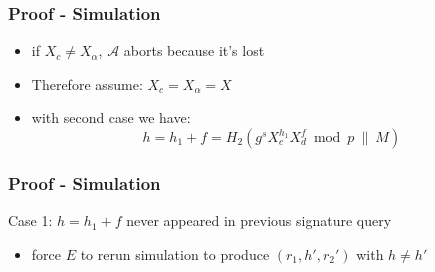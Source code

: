 \begin{frame}
	\frametitle{Proof - Simulation}

	\begin{itemize}
		\item if $X_c \neq X_\alpha$, $\mathcal{A}$ aborts because it's lost
		\item Therefore assume: $X_c = X_\alpha = X$
		\item with second case we have:
			$$h = h_1 + f = H_2(g^s X_{c}^{h_1} X_d^f \bmod p ~\|~ M)$$
	\end{itemize}
\end{frame}

\begin{frame}
	\frametitle{Proof - Simulation}

	Case 1: $h = h_1 + f$ never appeared in previous signature query

	\begin{itemize}
		\item force $E$ to rerun simulation to produce $(r_1, h', r_2')$ with $h \neq h'$
	\end{itemize}

\end{frame}
